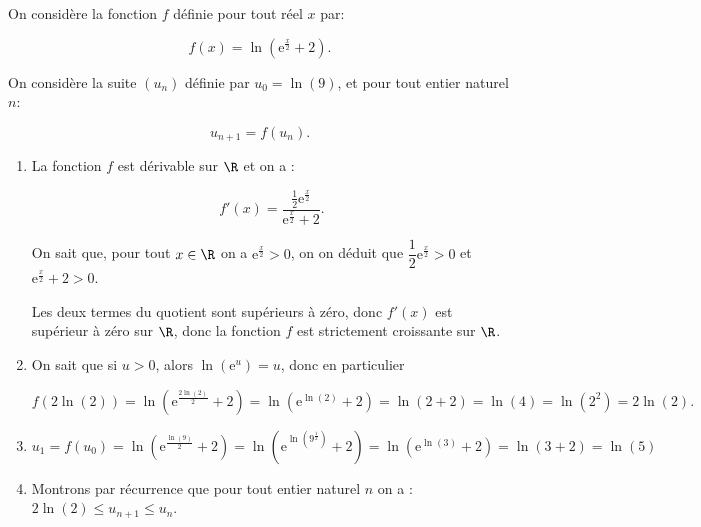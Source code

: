 \smallskip

On considère la fonction $f$ définie pour tout réel $x$ par:

\[f(x) = \ln\left ( \text{e}^{\frac{x}{2}}+2 \right ).\]

On considère la suite $(u_n)$ définie par $u_0= \ln\left (9\right )$, et pour tout entier naturel $n$:

\[u_{n+1}= f\left (u_n\right ).\]

\begin{enumerate}
	\item La fonction $f$ est dérivable sur $\R$ et on a :

	\[\boxed{f'(x) = \dfrac{\textstyle\frac{1}{2}\text{e}^{\frac{x}{2}}}{\text{e}^{\frac{x}{2}}+2}}.\]

	\smallskip

On sait que, pour tout $x \in \R$ on a $\text{e}^{\frac{x}{2}} > 0$, on on déduit que 
$\dfrac12 \text{e}^{\frac{x}{2}} > 0$ et  $\text{e}^{\frac{x}{2}} + 2 > 0$.

Les deux termes du quotient sont supérieurs à zéro, donc  $f'(x)$ est supérieur à zéro sur $\R$, donc la fonction $f$ est strictement croissante sur $\R$.

	\item On sait que si $u > 0$, \: alors $\ln \left(\text{e}^{u}\right) = u$, donc en particulier 
	
\[f\left(2\ln(2)\right) = \ln\left(\text{e}^{\frac{2\ln(2)}{2}} + 2\right) = \ln\left(\text{e}^{\ln(2)} + 2\right) = \ln(2 + 2) = \ln(4) = \ln\left(2^{2}\right) = \boxed{2\ln(2)}.\]

	\item \quad $u_{1} = f\left(u_{0}\right) = \ln\left(\text{e}^{\frac{\ln(9)}{2}} + 2\right) = \ln\left(\text{e}^{\ln\left(9^{\frac{1}{2}}\right)} + 2\right) = \ln\left(\text{e}^{\ln(3)} + 2\right) = \ln(3 + 2) = \boxed{\ln(5)}$
	
	\item Montrons par récurrence que pour tout entier naturel $n$ on a : $2\ln(2) \leqslant u_{n+1} \leqslant u_{n}$.

\end{enumerate}
